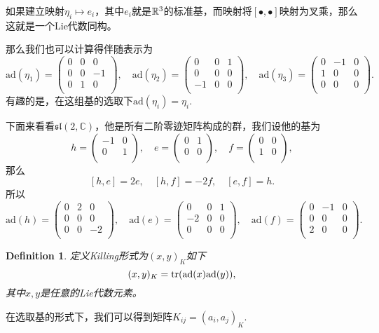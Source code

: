 \documentclass[8pt]{book}
\theoremstyle{plain}
\newtheorem{defi}{Definition}
\newcommand{\cc}{\mathbb{C}}
\newcommand{\ad}{{\mathrm{ad}}}
\begin{document}
如果建立映射$\eta_i\mapsto e_i$，其中$e_i$就是$\mathbb{R}^3$的标准基，而映射将$[\bullet,\bullet]$映射为叉乘，那么这就是一个Lie代数同构。

那么我们也可以计算得伴随表示为
\[
	\ad(\eta_1)=
		\begin{pmatrix}
			0&0&0\\
			0&0&-1\\
			0&1&0\\
		\end{pmatrix},\quad
	\ad(\eta_2)=
		\begin{pmatrix}
			0&0&1\\
			0&0&0\\
			-1&0&0\\
		\end{pmatrix},\quad
	\ad(\eta_3)=
		\begin{pmatrix}
			0&-1&0\\
			1&0&0\\
			0&0&0\\
		\end{pmatrix}.
\]
有趣的是，在这组基的选取下$\ad(\eta_i)=\eta_i$.

下面来看看$\mathfrak{sl}(2,\cc)$，他是所有二阶零迹矩阵构成的群，我们设他的基为
\[
h=\begin{pmatrix}
	-1&0\\
	0&1\\
\end{pmatrix},\quad
e=\begin{pmatrix}
	0&1\\
	0&0\\
\end{pmatrix},\quad
f=\begin{pmatrix}
	0&0\\
	1&0\\
\end{pmatrix},
\]
那么
\[
[h,e]=2e,\quad[h,f]=-2f,\quad[e,f]=h.
\]
所以
\[
	\ad(h)=
		\begin{pmatrix}
			0&2&0\\
			0&0&0\\
			0&0&-2\\
		\end{pmatrix},\quad
	\ad(e)=
		\begin{pmatrix}
			0&0&1\\
			-2&0&0\\
			0&0&0\\
		\end{pmatrix},\quad
	\ad(f)=
		\begin{pmatrix}
			0&-1&0\\
			0&0&0\\
			2&0&0\\
		\end{pmatrix}.
\]
\begin{defi}
定义Killing形式为$(x,y)_K$如下
\[
	(x,y)_K=\tr(\ad(x)\ad(y)),
\]
其中$x,y$是任意的Lie代数元素。
\end{defi}
在选取基的形式下，我们可以得到矩阵$K_{ij}=(a_i,a_j)_K$.
\end{document}
